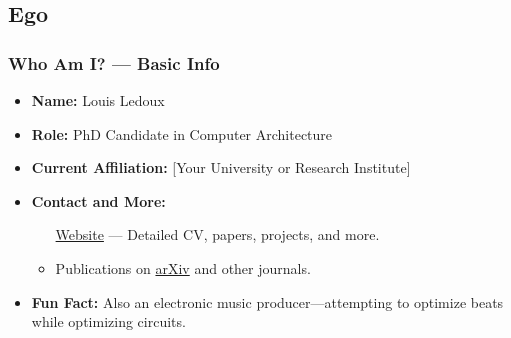 \subsection{Ego}
%

\begin{frame}
	\frametitle{Who Am I? — Basic Info}
	\begin{itemize}
		\item \textbf{Name:} Louis Ledoux
		\item \textbf{Role:} PhD Candidate in Computer Architecture
		\item \textbf{Current Affiliation:} [Your University or Research Institute]
		\item \textbf{Contact and More:}
		\begin{itemize}
			\item [\href{https://example.com}{Website}] — Detailed CV, papers, projects, and more.
			\item Publications on \href{https://arxiv.org/}{arXiv} and other journals.
		\end{itemize}
		\item \textbf{Fun Fact:} Also an electronic music producer—attempting to optimize beats while optimizing circuits.
	\end{itemize}
\end{frame}

